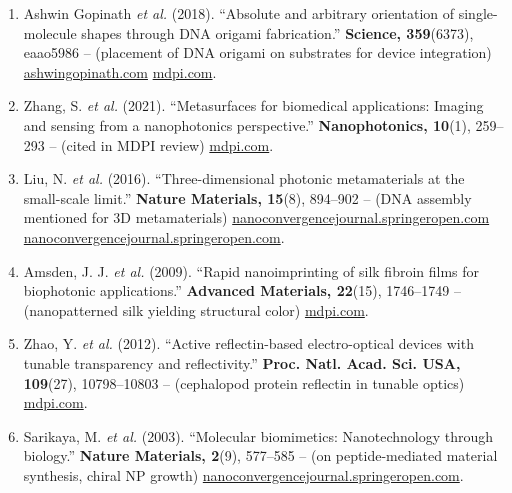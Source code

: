 \documentclass[11pt,a4paper]{article}
\begin{document}
\begin{enumerate}
  \item Ashwin Gopinath \emph{et al.} (2018). ``Absolute and arbitrary orientation of single-molecule shapes through DNA origami fabrication.'' \textbf{Science, 359}(6373), eaao5986 -- (placement of DNA origami on substrates for device integration) \href{https://ashwingopinath.com/large-area-nanopatterning#:~:text=Figure ,large area patterning could be}{ashwingopinath.com} \href{https://www.mdpi.com/2079-6374/12/11/962#:~:text=DNA origami can be organized,lithography to create discrete%2C well}{mdpi.com}.
  \item Zhang, S. \emph{et al.} (2021). ``Metasurfaces for biomedical applications: Imaging and sensing from a nanophotonics perspective.'' \textbf{Nanophotonics, 10}(1), 259--293 -- (cited in MDPI review) \href{https://www.mdpi.com/2079-6374/12/11/962#:~:text=Metasurfaces are structures that consist,lead to new applications%2C including}{mdpi.com}.
  \item Liu, N. \emph{et al.} (2016). ``Three-dimensional photonic metamaterials at the small-scale limit.'' \textbf{Nature Materials, 15}(8), 894--902 -- (DNA assembly mentioned for 3D metamaterials) \href{https://nanoconvergencejournal.springeropen.com/articles/10.1186/s40580-020-00226-7#:~:text=match at L923 DNA,143]. Here%2C DNA is}{nanoconvergencejournal.springeropen.com} \href{https://nanoconvergencejournal.springeropen.com/articles/10.1186/s40580-020-00226-7#:~:text=fabricated by self,DNA sequences for achieving different}{nanoconvergencejournal.springeropen.com}.
  \item Amsden, J. J. \emph{et al.} (2009). ``Rapid nanoimprinting of silk fibroin films for biophotonic applications.'' \textbf{Advanced Materials, 22}(15), 1746--1749 -- (nanopatterned silk yielding structural color) \href{https://www.mdpi.com/2079-6374/12/11/962#:~:text=In 2009%2C Amsden et al,illumination and angle of collection}{mdpi.com}.
  \item Zhao, Y. \emph{et al.} (2012). ``Active reflectin-based electro-optical devices with tunable transparency and reflectivity.'' \textbf{Proc. Natl. Acad. Sci. USA, 109}(27), 10798--10803 -- (cephalopod protein reflectin in tunable optics) \href{https://www.mdpi.com/2079-6374/12/11/962#:~:text=photonic nanoscale architectures that can,mostly in determining the assembly}{mdpi.com}.
  \item Sarikaya, M. \emph{et al.} (2003). ``Molecular biomimetics: Nanotechnology through biology.'' \textbf{Nature Materials, 2}(9), 577--585 -- (on peptide-mediated material synthesis, chiral NP growth) \href{https://nanoconvergencejournal.springeropen.com/articles/10.1186/s40580-020-00226-7#:~:text=that enabled the reconfigurability,directed helical}{nanoconvergencejournal.springeropen.com}.
\end{enumerate}
\end{document}
